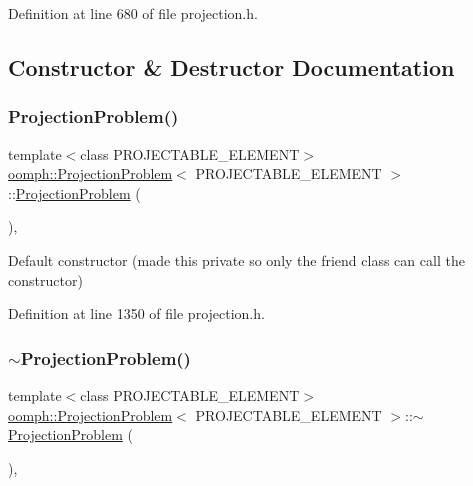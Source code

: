Definition at line 680 of file projection.\+h.



\subsection{Constructor \& Destructor Documentation}
\mbox{\label{classoomph_1_1ProjectionProblem_a4091e944bf95ae7b3cc86ac427d93257}} 
\subsubsection{\texorpdfstring{Projection\+Problem()}{ProjectionProblem()}}
{\footnotesize\ttfamily template$<$class P\+R\+O\+J\+E\+C\+T\+A\+B\+L\+E\+\_\+\+E\+L\+E\+M\+E\+NT$>$ \\
\hyperlink{classoomph_1_1ProjectionProblem}{oomph\+::\+Projection\+Problem}$<$ P\+R\+O\+J\+E\+C\+T\+A\+B\+L\+E\+\_\+\+E\+L\+E\+M\+E\+NT $>$\+::\hyperlink{classoomph_1_1ProjectionProblem}{Projection\+Problem} (\begin{DoxyParamCaption}{ }\end{DoxyParamCaption})\hspace{0.3cm}{\ttfamily [inline]}, {\ttfamily [private]}}

Default constructor (made this private so only the friend class can call the constructor) 

Definition at line 1350 of file projection.\+h.

\mbox{\label{classoomph_1_1ProjectionProblem_a2b18253c5a5f783a329307315e9ef69c}} 
\subsubsection{\texorpdfstring{$\sim$\+Projection\+Problem()}{~ProjectionProblem()}}
{\footnotesize\ttfamily template$<$class P\+R\+O\+J\+E\+C\+T\+A\+B\+L\+E\+\_\+\+E\+L\+E\+M\+E\+NT$>$ \\
\hyperlink{classoomph_1_1ProjectionProblem}{oomph\+::\+Projection\+Problem}$<$ P\+R\+O\+J\+E\+C\+T\+A\+B\+L\+E\+\_\+\+E\+L\+E\+M\+E\+NT $>$\+::$\sim$\hyperlink{classoomph_1_1ProjectionProblem}{Projection\+Problem} (\begin{DoxyParamCaption}{ }\end{DoxyParamCaption})\hspace{0.3cm}{\ttfamily [inline]}, {\ttfamily [private]}}



